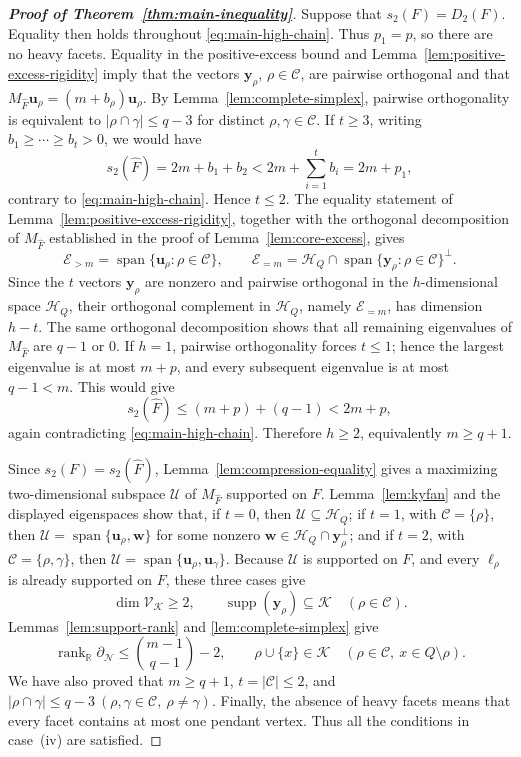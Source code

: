 \documentclass[11pt]{article}
\newcommand{\R}{\mathbb{R}}
\newcommand{\rank}{\operatorname{rank}}
\newcommand{\Span}{\operatorname{span}}
\newcommand{\supp}{\operatorname{supp}}
\newcommand{\bd}{\partial}
\newcommand{\calC}{\mathcal{C}}
\newcommand{\calK}{\mathcal{K}}
\newcommand{\calN}{\mathcal{N}}
\newcommand{\scrH}{\mathscr{H}}
\newcommand{\scrU}{\mathscr{U}}
\newcommand{\scrV}{\mathscr{V}}
\newcommand{\scrE}{\mathscr{E}}
\begin{document}
\begin{proof}[\textup{\textbf{Proof of Theorem~\ref{thm:main-inequality}}}]
Suppose that \(s_2(F)=D_2(F)\). Equality then holds throughout \eqref{eq:main-high-chain}. Thus \(p_1=p\), so there are no heavy facets. Equality in the positive-excess bound and Lemma~\ref{lem:positive-excess-rigidity} imply that the vectors \(\mathbf y_\rho\), \(\rho\in\calC\), are pairwise orthogonal and that \(M_{\widehat F}\mathbf u_\rho=(m+b_\rho)\mathbf u_\rho\). By Lemma~\ref{lem:complete-simplex}, pairwise orthogonality is equivalent to \(|\rho\cap\gamma|\leq q-3\) for distinct \(\rho,\gamma\in\calC\). If \(t\geq3\), writing \(b_1\geq\cdots\geq b_t>0\), we would have
\[
s_2(\widehat F)=2m+b_1+b_2<2m+\sum_{i=1}^t b_i=2m+p_1,
\]
contrary to \eqref{eq:main-high-chain}. Hence \(t\leq2\).
The equality statement of
Lemma~\ref{lem:positive-excess-rigidity}, together with the orthogonal
decomposition of \(M_{\widehat F}\) established in the proof of
Lemma~\ref{lem:core-excess}, gives
\[
\scrE_{>m}
=
\Span\{\mathbf u_\rho:\rho\in\calC\},
\qquad
\scrE_{=m}
=
\scrH_Q\cap
\Span\{\mathbf y_\rho:\rho\in\calC\}^{\perp}.
\]
Since the \(t\) vectors \(\mathbf y_\rho\) are nonzero and pairwise
orthogonal in the \(h\)-dimensional space \(\scrH_Q\), their orthogonal
complement in \(\scrH_Q\), namely \(\scrE_{=m}\), has dimension \(h-t\).
The same orthogonal decomposition shows that all remaining eigenvalues
of \(M_{\widehat F}\) are \(q-1\) or \(0\).  If \(h=1\), pairwise orthogonality forces \(t\leq1\); hence the largest eigenvalue is at most \(m+p\), and every subsequent eigenvalue is at most \(q-1<m\). This would give
\[
s_2(\widehat F)\leq(m+p)+(q-1)<2m+p,
\]
again contradicting \eqref{eq:main-high-chain}. Therefore \(h\geq2\), equivalently \(m\geq q+1\).

Since \(s_2(F)=s_2(\widehat F)\), Lemma~\ref{lem:compression-equality} gives a maximizing two-dimensional subspace \(\scrU\) of \(M_{\widehat F}\) supported on \(F\). Lemma~\ref{lem:kyfan} and the displayed eigenspaces show that, if \(t=0\), then \(\scrU\subseteq\scrH_Q\); if \(t=1\), with \(\calC=\{\rho\}\), then \(\scrU=\Span\{\mathbf u_\rho,\mathbf w\}\) for some nonzero \(\mathbf w\in\scrH_Q\cap\mathbf y_\rho^\perp\); and if \(t=2\), with \(\calC=\{\rho,\gamma\}\), then \(\scrU=\Span\{\mathbf u_\rho,\mathbf u_\gamma\}\). Because \(\scrU\) is supported on \(F\), and every \(\boldsymbol{\ell}_\rho\) is already supported on \(F\), these three cases give
\[
\dim\scrV_{\calK}\geq2,\qquad
\supp(\mathbf y_\rho)\subseteq\calK\quad(\rho\in\calC).
\]
Lemmas~\ref{lem:support-rank} and \ref{lem:complete-simplex} give
\[
\rank_{\R}\bd_{\calN}
\leq\binom{m-1}{q-1}-2,
\qquad
\rho\cup\{x\}\in\calK
\quad(\rho\in\calC,\ x\in Q\setminus\rho).
\]
We have also proved that \(m\geq q+1\), \(t=|\calC|\leq2\), and
$|\rho\cap\gamma|\leq q-3\ (\rho,\gamma\in\calC,\ \rho\neq\gamma).$
Finally, the absence of heavy facets means that every facet contains at
most one pendant vertex. Thus all the conditions in
case~\textup{(iv)} are satisfied.


\end{proof}
\end{document}
